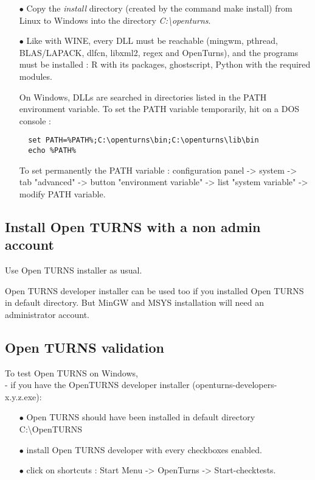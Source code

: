 \documentclass[11pt]{article}
\begin{document}
\begin{itemize}
\item[$\bullet$]   Copy the \emph{install} directory (created by the command make install) from Linux to Windows into the directory \emph{C:\textbackslash openturns}.

\item[$\bullet$]   Like with WINE, every DLL must be reachable (mingwm, pthread, BLAS/LAPACK, dlfcn, libxml2, regex and OpenTurns), and the programs must be installed : R with its packages, ghostscript, Python with the required modules.

  On Windows, DLLs are searched in directories listed in the PATH environment variable. To set the PATH variable temporarily, hit on a DOS console :
\begin{verbatim}
  set PATH=%PATH%;C:\openturns\bin;C:\openturns\lib\bin
  echo %PATH%
\end{verbatim}

  To set permanently the PATH variable :
  configuration panel -> system -> tab "advanced" -> button "environment variable" -> list "system variable" -> modify PATH variable.
\end{itemize}


\subsection{Install Open TURNS with a non admin account}

Use Open TURNS installer as usual.

Open TURNS developer installer can be used too if you installed Open TURNS in default directory. But MinGW and MSYS installation will need an administrator account.


\subsection{Open TURNS validation}

To test Open TURNS on Windows,\\

- if you have the OpenTURNS developer installer (openturns-developers-x.y.z.exe):
\begin{itemize}
\item[$\bullet$]   Open TURNS should have been installed in default directory C:\textbackslash OpenTURNS
\item[$\bullet$]   install Open TURNS developer with every checkboxes enabled.
\item[$\bullet$]   click on shortcuts : Start Menu -> OpenTurns -> Start-checktests.
\end{itemize}
\end{document}
